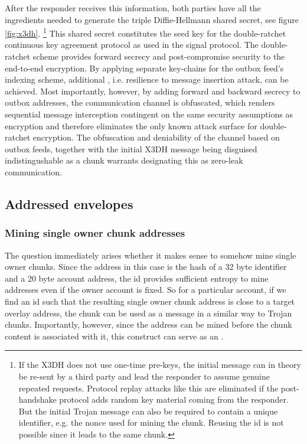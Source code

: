 After the responder receives this information, both parties have all the ingredients needed to generate the triple Diffie-Hellmann shared secret, see figure \ref{fig:x3dh}.%
%
\footnote{If the X3DH does not use one-time pre-keys, the initial message can in theory be re-sent by a third party and lead the responder to assume genuine repeated requests. Protocol replay attacks like this are eliminated if the post-handshake protocol adds random key material coming from the responder. 
But the initial Trojan message can also be required to contain a unique identifier, e.g. the nonce used for mining the chunk. Reusing the id is not possible since it leads to the same chunk.}
%
This shared secret constitutes the seed key for the double-ratchet continuous key agreement protocol as used in the signal protocol. The double-ratchet scheme provides forward secrecy and post-compromise security to the end-to-end encryption. By applying separate key-chains for the outbox feed's indexing scheme, additional , i.e. resilience to message insertion attack, can be achieved. Most importantly, however, by adding forward and backward secrecy to outbox addresses, the communication channel is obfuscated, which renders sequential message interception contingent on the same security assumptions as encryption and therefore eliminates the only known attack surface for double-ratchet encryption. The obfuscation and deniability of the channel based on outbox feeds, together with the initial X3DH message being disguised indistingushable as a chunk warrants designating this as  zero-leak communication.

\subsection{Addressed envelopes\statusgreen}\label{sec:addressed-envelopes}

\subsubsection{Mining single owner chunk addresses}

The question immediately arises whether it makes sense to somehow mine single owner chunks. Since the address in this case is the hash of a 32 byte identifier and a 20 byte account address, the id provides sufficient entropy to mine addresses even if the owner account is fixed. So for a particular account, if we find an id such that the resulting single owner chunk address is close to a target overlay address, the chunk can be used as a message in a similar way to Trojan chunks. Importantly, however, since the address can be mined before the chunk content is associated with it, this construct can serve as an .

